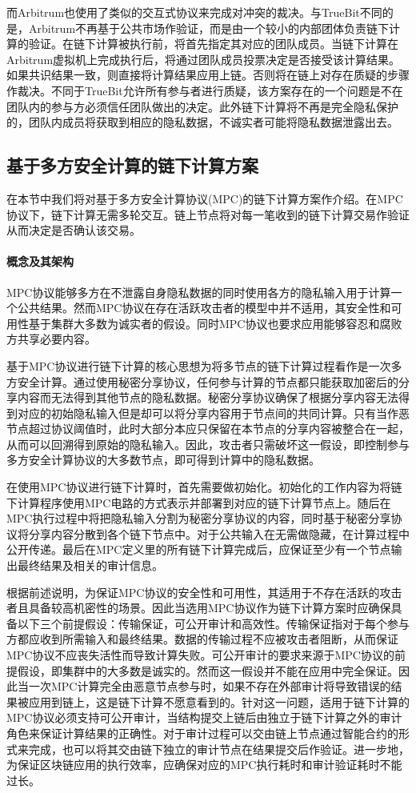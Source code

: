 而Arbitrum\cite{217511}也使用了类似的交互式协议来完成对冲突的裁决。与TrueBit不同的是，Arbitrum不再基于公共市场作验证，而是由一个较小的内部团体负责链下计算的验证。在链下计算被执行前，将首先指定其对应的团队成员。当链下计算在Arbitrum虚拟机上完成执行后，将通过团队成员投票决定是否接受该计算结果。如果共识结果一致，则直接将计算结果应用上链。否则将在链上对存在质疑的步骤作裁决。不同于TrueBit允许所有参与者进行质疑，该方案存在的一个问题是不在团队内的参与方必须信任团队做出的决定。此外链下计算将不再是完全隐私保护的，团队内成员将获取到相应的隐私数据，不诚实者可能将隐私数据泄露出去。

\subsection{基于多方安全计算的链下计算方案}
在本节中我们将对基于多方安全计算协议(MPC)的链下计算方案作介绍。在MPC协议下，链下计算无需多轮交互。链上节点将对每一笔收到的链下计算交易作验证从而决定是否确认该交易。

\paragraph{概念及其架构} 
MPC协议能够多方在不泄露自身隐私数据的同时使用各方的隐私输入用于计算一个公共结果。然而MPC协议在存在活跃攻击者的模型中并不适用，其安全性和可用性基于集群大多数为诚实者的假设\cite{cryptoeprint:2019/883}。同时MPC协议也要求应用能够容忍和腐败方共享必要内容。

基于MPC协议进行链下计算的核心思想为将多节点的链下计算过程看作是一次多方安全计算。通过使用秘密分享协议\cite{10.1145/359168.359176}，任何参与计算的节点都只能获取加密后的分享内容而无法得到其他节点的隐私数据。秘密分享协议确保了根据分享内容无法得到对应的初始隐私输入但是却可以将分享内容用于节点间的共同计算。只有当作恶节点超过协议阈值时，此时大部分本应只保留在本节点的分享内容被整合在一起，从而可以回溯得到原始的隐私输入。因此，攻击者只需破坏这一假设，即控制参与多方安全计算协议的大多数节点，即可得到计算中的隐私数据。

在使用MPC协议进行链下计算时，首先需要做初始化。初始化的工作内容为将链下计算程序使用MPC电路的方式表示并部署到对应的链下计算节点上。随后在MPC执行过程中将把隐私输入分割为秘密分享协议的内容，同时基于秘密分享协议将分享内容分散到各个链下节点中。对于公共输入在无需做隐藏，在计算过程中公开传递。最后在MPC定义里的所有链下计算完成后，应保证至少有一个节点输出最终结果及相关的审计信息。

根据前述说明，为保证MPC协议的安全性和可用性，其适用于不存在活跃的攻击者且具备较高机密性的场景。因此当选用MPC协议作为链下计算方案时应确保具备以下三个前提假设：传输保证，可公开审计和高效性\cite{8726497}。传输保证指对于每个参与方都应收到所需输入和最终结果。数据的传输过程不应被攻击者阻断，从而保证MPC协议不应丧失活性而导致计算失败\cite{Barak}。可公开审计的要求来源于MPC协议的前提假设，即集群中的大多数是诚实的。然而这一假设并不能在应用中完全保证。因此当一次MPC计算完全由恶意节点参与时，如果不存在外部审计将导致错误的结果被应用到链上，这是链下计算不愿意看到的。针对这一问题，适用于链下计算的MPC协议必须支持可公开审计，当结构提交上链后由独立于链下计算之外的审计角色来保证计算结果的正确性。对于审计过程可以交由链上节点通过智能合约的形式来完成，也可以将其交由链下独立的审计节点在结果提交后作验证。进一步地，为保证区块链应用的执行效率，应确保对应的MPC执行耗时和审计验证耗时不能过长。

